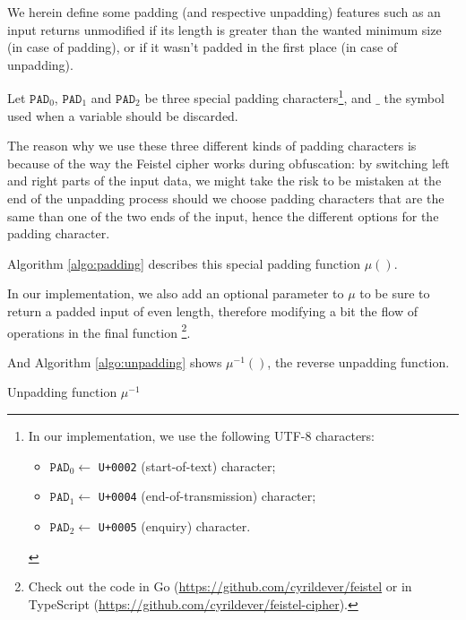 \documentclass[twoside,twocolumn]{article}
\theoremstyle{definition}
\theoremstyle{remark}
\begin{document}
We herein define some padding (and respective unpadding) features such as an input returns unmodified if its length is greater than the wanted minimum 
size (in case of padding), or if it wasn't padded in the first place (in case of unpadding).

Let $\texttt{PAD}_0$, $\texttt{PAD}_1$ and $\texttt{PAD}_2$ be three special padding characters\footnote{In our implementation, we use the following 
UTF-8 characters:
\begin{itemize}
    \item $\texttt{PAD}_0 \gets$ \texttt{U+0002} (start-of-text) character;
    \item $\texttt{PAD}_1 \gets$ \texttt{U+0004} (end-of-transmission) character;
    \item $\texttt{PAD}_2 \gets$ \texttt{U+0005} (enquiry) character.
\end{itemize}}, and $\_$ the symbol used when a variable should be discarded.

The reason why we use these three different kinds of padding characters is because of the way the Feistel cipher works during obfuscation: by switching 
left and right parts of the input data, we might take the risk to be mistaken at the end of the unpadding process should we choose padding characters 
that are the same than one of the two ends of the input, hence the different options for the padding character.

Algorithm \ref{algo:padding} describes this special padding function $\mu()$.

In our implementation, we also add an optional parameter to $\mu$ to be sure to return a padded input of even length, therefore modifying a bit 
the flow of operations in the final function \footnote{Check out the code in Go (\url{https://github.com/cyrildever/feistel} or in TypeScript  
(\url{https://github.com/cyrildever/feistel-cipher}).}.

And Algorithm \ref{algo:unpadding} shows $\mu^{-1}()$, the reverse unpadding function.

\begin{algorithm}
    \caption{Unpadding function $\mu^{-1}$}
    \label{algo:unpadding}
\end{algorithm}
\end{document}
